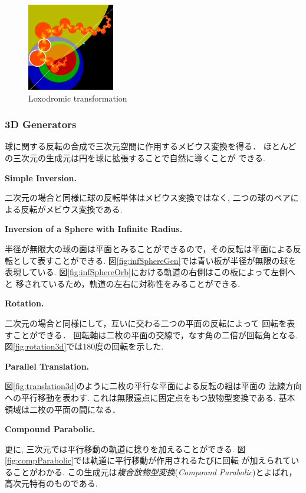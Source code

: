 \begin{figure}[htbp]
 \begin{minipage}[]{0.22\hsize}
  \center
  \includegraphics[width=1.5in, height=1.5in, keepaspectratio]{../img/klein/2diis/loxodromicEdged.pdf}
  \caption{Loxodromic transformation}
  \label{fig:loxodromic2d}
 \end{minipage}
\end{figure}

\subsubsection{3D Generators}

球に関する反転の合成で三次元空間に作用するメビウス変換を得る．
ほとんどの三次元の生成元は円を球に拡張することで自然に導くことが
できる.

\noindent\textbf{Simple Inversion.}

二次元の場合と同様に球の反転単体はメビウス変換ではなく, 二つの球のペアに
よる反転がメビウス変換である.

\noindent\textbf{Inversion of a Sphere with Infinite Radius.}

半径が無限大の球の面は平面とみることができるので，その反転は平面による反
転として表すことができる.
図\ref{fig:infSphereGen}では青い板が半径が無限の球を表現している.
図\ref{fig:infSphereOrb}における軌道の右側はこの板によって左側へと
移されているため，軌道の左右に対称性をみることができる.

\noindent\textbf{Rotation.}

二次元の場合と同様にして，互いに交わる二つの平面の反転によって
回転を表すことができる．
回転軸は二枚の平面の交線で，なす角の二倍が回転角となる.
図\ref{fig:rotation3d}では180度の回転を示した.

\noindent\textbf{Parallel Translation.}

図\ref{fig:translation3d}のように二枚の平行な平面による反転の組は平面の
法線方向への平行移動を表わす.
これは無限遠点に固定点をもつ放物型変換である.
基本領域は二枚の平面の間になる．

\noindent\textbf{Compound Parabolic.}

更に, 三次元では平行移動の軌道に捻りを加えることができる.
図\ref{fig:compParabolic}では軌道に平行移動が作用されるたびに回転
が加えられていることがわかる.
この生成元は\emph{複合放物型変換}(\textit{Compound Parabolic})とよばれ，
高次元特有のものである.


